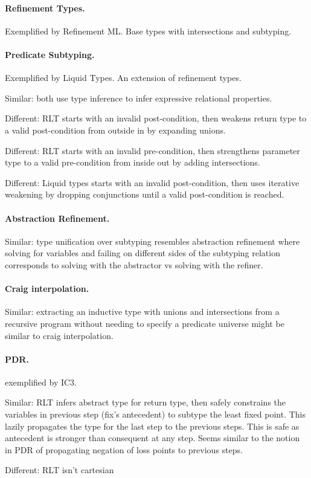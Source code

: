 \documentclass[acmsmall]{acmart}
\theoremstyle{definition}
\begin{document}
\paragraph{Refinement Types.}
Exemplified by Refinement ML. Base types with intersections and subtyping.

\paragraph{Predicate Subtyping.}
Exemplified by Liquid Types. An extension of refinement types.

Similar: both use type inference to infer expressive relational properties. 

Different: RLT starts with an invalid post-condition, then weakens return type to a valid post-condition from outside in by expanding unions.

Different: RLT starts with an invalid pre-condition, then strengthens parameter type to a valid pre-condition from inside out by adding intersections.

Different: Liquid types starts with an invalid post-condition, then uses iterative weakening by dropping conjunctions until a valid post-condition is reached.


\paragraph{Abstraction Refinement.} 
Similar: type unification over subtyping resembles abstraction refinement  
where solving for variables and failing on different sides of the subtyping relation corresponds to
solving with the abstractor vs solving with the refiner.

\paragraph{Craig interpolation.} 
Similar: extracting an inductive type with unions and intersections 
from a recursive program without needing to specify a predicate universe might be similar to
craig interpolation.

\paragraph{PDR.}
exemplified by IC3. 

Similar: RLT infers abstract type for return type, 
then safely constrains the variables in previous step (fix's antecedent) 
to subtype the least fixed point.
This lazily propagates the type for the last step to the previous steps.
This is safe as antecedent is stronger than consequent at any step.
Seems similar to the notion in PDR of propagating negation of loss points to previous steps. 

Different: RLT isn't cartesian
\end{document}
